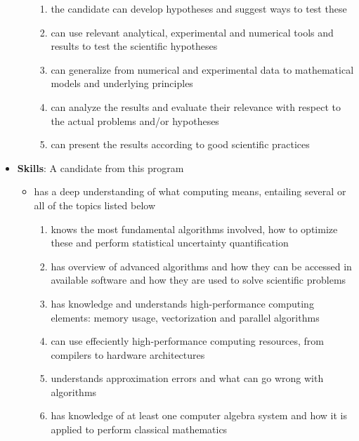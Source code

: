 \documentclass{article}
\begin{document}
\begin{itemize}
\begin{itemize}
\begin{enumerate}
 \item the candidate can develop hypotheses and suggest ways to test these

 \item can use relevant analytical, experimental and numerical tools and results to test the scientific hypotheses

 \item can generalize from numerical and experimental data to mathematical models and underlying principles

 \item can analyze the results and evaluate their relevance with respect to the actual problems and/or hypotheses

 \item can present the results according to good scientific practices

\end{enumerate}

\noindent
\end{itemize}

\noindent
\item \textbf{Skills}: A candidate from this program
\begin{itemize}

 \item has a deep understanding of what computing means, entailing several or all of the topics listed below
\begin{enumerate}

 \item knows the most fundamental algorithms involved, how to optimize these and perform statistical uncertainty quantification

 \item has overview of advanced algorithms and how they can be accessed in available software and how they are used to solve scientific problems

 \item has knowledge and understands high-performance computing elements: memory usage, vectorization and parallel algorithms

 \item can use effeciently high-performance computing resources, from compilers to hardware architectures

 \item understands approximation errors and what can go wrong with algorithms

 \item has knowledge of at least one computer algebra system and how it is applied to perform classical mathematics


\end{enumerate}
\end{itemize}
\end{itemize}
\end{document}
